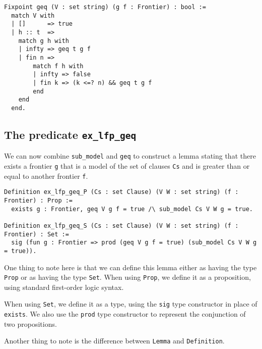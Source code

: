 \begin{minipage}{\linewidth}
\begin{lstlisting}[language=Coq, label={lst:geq_def}, caption={Pointwise comparing frontiers with \lstinline{geq} in Coq}]
Fixpoint geq (V : set string) (g f : Frontier) : bool :=
  match V with
  | []      => true
  | h :: t  =>
    match g h with
    | infty => geq t g f
    | fin n =>
        match f h with
        | infty => false
        | fin k => (k <=? n) && geq t g f
        end
    end
  end.
\end{lstlisting}
\end{minipage}

\subsection{The predicate \lstinline{ex_lfp_geq}}

We can now combine \lstinline{sub_model} and \lstinline{geq} to construct a lemma
stating that there exists a frontier \lstinline{g} that is a model of the set of clauses \lstinline{Cs}
and is greater than or equal to another frontier \lstinline{f}.

\begin{minipage}{\linewidth}
\begin{lstlisting}[language=Coq, label={lst:ex_lfp_geq_def}, caption={\lstinline{ex_lfp_geq} in Coq, using both \lstinline{Prop} and \lstinline{Set}}]
Definition ex_lfp_geq_P (Cs : set Clause) (V W : set string) (f : Frontier) : Prop :=
  exists g : Frontier, geq V g f = true /\ sub_model Cs V W g = true.

Definition ex_lfp_geq_S (Cs : set Clause) (V W : set string) (f : Frontier) : Set :=
  sig (fun g : Frontier => prod (geq V g f = true) (sub_model Cs V W g = true)).
\end{lstlisting}
\end{minipage}

One thing to note here is that we can define this lemma either as having the type \lstinline{Prop} or as having the type \lstinline{Set}.
When using \lstinline{Prop}, we define it as a proposition, using standard first-order logic syntax.

When using \lstinline{Set}, we define it as a type,
using the \lstinline{sig} type constructor in place of \lstinline{exists}.
We also use the \lstinline{prod} type constructor to represent the conjunction of two propositions.

Another thing to note is the difference between \lstinline{Lemma} and \lstinline{Definition}.

